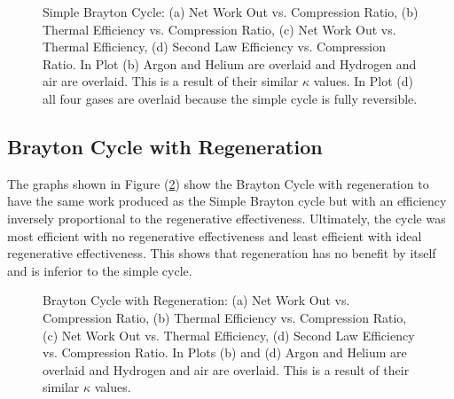 \documentclass[
	12pt, %
]{brayton_cycle_report_style}
\begin{document}
\begin{figure}[]%
    \centering
    \subfloat[\centering]{{}}%
    \qquad
    \subfloat[\centering]{{ }}%
    \qquad
    \subfloat[\centering]{{ }}%
    \qquad
    \subfloat[\centering]{{ }}%
    \caption{Simple Brayton Cycle: (a) Net Work Out vs. Compression Ratio, (b) Thermal Efficiency vs. Compression Ratio, (c) Net Work Out vs. Thermal Efficiency, (d) Second Law Efficiency vs. Compression Ratio. In Plot (b) Argon and Helium are overlaid and Hydrogen and air are overlaid. This is a result of their similar $\kappa$ values. In Plot (d) all four gases are overlaid because the simple cycle is fully reversible. } %
    \label{fig:simple_brayton_cycle}%
\end{figure}

\subsection{Brayton Cycle with Regeneration}

The graphs shown in Figure (\ref{fig:Brayton_Cycle_Regeneration}) show the Brayton Cycle with regeneration to have the same work produced as the Simple Brayton cycle but with an efficiency inversely proportional to the regenerative effectiveness. Ultimately, the cycle was most efficient with no regenerative effectiveness and least efficient with ideal regenerative effectiveness. This shows that regeneration has no benefit by itself and is inferior to the simple cycle. 

\begin{figure}%
    \centering
    \subfloat[\centering]{{}}%
    \qquad
    \subfloat[\centering]{{ }}%
    \qquad
    \subfloat[\centering]{{ }}%
    \qquad
    \subfloat[\centering]{{ }}%
    \caption{Brayton Cycle with Regeneration: (a) Net Work Out vs. Compression Ratio, (b) Thermal Efficiency vs. Compression Ratio, (c) Net Work Out vs. Thermal Efficiency, (d) Second Law Efficiency vs. Compression Ratio. In Plots (b) and (d) Argon and Helium are overlaid and Hydrogen and air are overlaid. This is a result of their similar $\kappa$ values.}%
    \label{fig:Brayton_Cycle_Regeneration}%
\end{figure}
\end{document}
